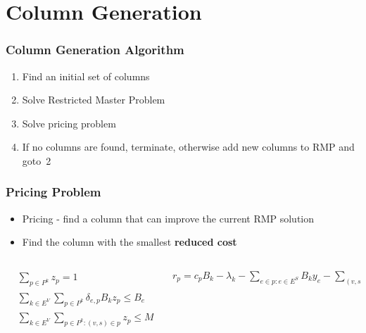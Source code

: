 \documentclass[english]{beamer}
\begin{document}
\section{Column Generation}
\begin{frame}
  \frametitle{Column Generation Algorithm}
  \pause
\begin{enumerate}
	\item Find an initial set of columns
	\item Solve Restricted Master Problem
	\item Solve pricing problem
	\item If no columns are found, terminate, otherwise add new columns to RMP and goto~2
\end{enumerate}
\end{frame}
\begin{frame}
  \frametitle{Pricing Problem}
  \begin{itemize}
    \item Pricing - find a column that can improve the current RMP solution
    \item Find the column with the smallest \textbf{reduced cost}
  \end{itemize}
  \pause


\begin{columns}
\begin{column}{0.4\textwidth}
  \scriptsize
  \begin{align}
        & \sum\limits_{p \in P^{k}} z_{p} = 1                                    & \forall k \in E^{V} \nonumber \\
        & \sum\limits_{k \in E^{V}}\sum\limits_{p \in P^{k}} \delta_{e,p} B_{k} z_{p} \leq B_{e} & \forall e \in E^{S} \nonumber \\
        &  \sum\limits_{k \in E^{V}}\sum\limits_{p \in P^k : (v,s) \in p} z_{p} \leq M x_{v,s} & \forall v \in V^{V} \nonumber \\
        & & s \in V^{S} \nonumber
  \end{align}
\end{column}

\pause

\begin{column}{0.4\textwidth}
  \scriptsize
  \centering
  \begin{align}
    r_{p} = c_{p} B_{k} - \lambda_{k} - \sum\limits_{e \in p : e \in E^S} B_{k} y_{e}  - \sum\limits_{(v,s) \in p : (v,s) \notin E^S} \pi_{v,s}  \nonumber
  \end{align}


\end{column}
\end{columns}
\end{frame}
\end{document}
